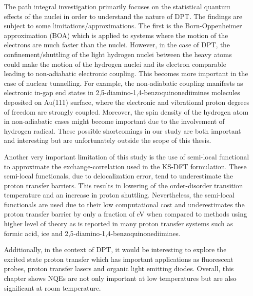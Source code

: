 \noindent The path integral investigation primarily focuses on the statistical quantum effects of the nuclei in order to understand the nature of DPT. The findings are subject to some limitations/approximations. The first is the Born-Oppenheimer approximation (BOA) which is applied to systems where the motion of the electrons are much faster than the nuclei. However, in the case of DPT, the confinement/shuttling of the light hydrogen nuclei between the heavy atoms could make the motion of the hydrogen nuclei and its electron comparable\cite{skone2006calculation} leading to non-adiabatic electronic coupling. This becomes more important in the case of nuclear tunnelling\cite{althorpe2016non}. For example, the non-adiabatic coupling manifests as electronic in-gap end states in 2,5-diamino-1,4-benzoquinonediimines molecules deposited on Au(111) surface\cite{cahlik2021significance}, where the electronic and vibrational proton degrees of freedom are strongly coupled. Moreover, the spin density of the hydrogen atom in non-adiabatic cases might become important due to the involvement of hydrogen radical\cite{althorpe2016non}. These possible shortcomings in our study are both important and interesting but are unfortunately outside the scope of this thesis. 

\noindent Another very important limitation of this study is the use of semi-local functional to approximate the exchange-correlation used in the KS-DFT formulation. These semi-local functionals, due to delocalization error, tend to underestimate the proton transfer barriers\cite{bryenton2023delocalization,ivanov2015quantum}. This results in lowering of the order-disorder transition temperature and an increase in proton shuttling. Nevertheless, the semi-local functionals are used due to their low computational cost and underestimates the proton transfer barrier by only a fraction of eV when compared to methods using higher level of theory as is reported in many proton transfer systems such as formic acid\cite{ivanov2015quantum}, ice\cite{drechsel2014quantum} and 2,5-diamino-1,4-benzoquinonediimines\cite{cahlik2021significance}. 

\noindent Additionally, in the context of DPT, it would be interesting to explore the excited state proton transfer which has important applications\cite{joshi2021excited} as fluorescent probes, proton transfer lasers and organic light emitting diodes. Overall, this chapter shows NQEs are not only important at low temperatures but are also significant at room temperature.  

